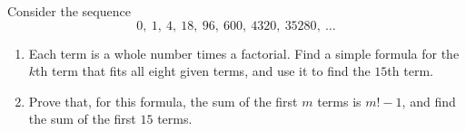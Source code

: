 Consider the sequence
\[0,\ 1,\ 4,\ 18,\ 96,\ 600,\ 4320,\ 35280,\ \dots\]
\begin{enumerate}
\item[(a)] Each term is a whole number times a factorial. Find a simple formula for the $k$th term that fits all eight given terms, and use it to find the $15$th term.
\item[(b)] Prove that, for this formula, the sum of the first $m$ terms is $m!-1$, and find the sum of the first $15$ terms.
\end{enumerate}
